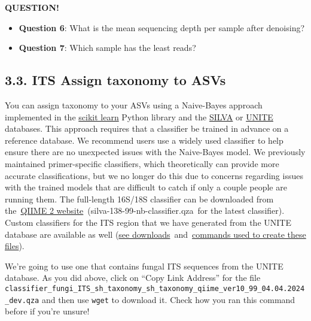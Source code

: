 \documentclass[
]{book}
\providecommand{\tightlist}{%
  \setlength{\itemsep}{0pt}\setlength{\parskip}{0pt}}
\newenvironment{bluebox}{
  \definecolor{shadecolor}{RGB}{172, 210, 237}
  \color{white}
  \begin{shaded}}
 {\end{shaded}}
\begin{document}
\begin{bluebox}

\begin{center}
\textbf{QUESTION!}

\end{center}

\begin{itemize}
\tightlist
\item
  \textbf{Question 6}: What is the mean sequencing depth per sample after denoising?
\item
  \textbf{Question 7}: Which sample has the least reads?
\end{itemize}

\end{bluebox}

\subsection{3.3. ITS Assign taxonomy to ASVs}\label{its-assign-taxonomy-to-asvs}

You can assign taxonomy to your ASVs using a Naive-Bayes approach implemented in the \href{http://scikit-learn.org/stable/}{scikit learn} Python library and the \href{https://www.arb-silva.de/}{SILVA} or \href{https://unite.ut.ee/}{UNITE} databases. This approach requires that a classifier be trained in advance on a reference database. We recommend users use a widely used classifier to help ensure there are no unexpected issues with the Naive-Bayes model. We previously maintained primer-specific classifiers, which theoretically can provide more accurate classifications, but we no longer do this due to concerns regarding issues with the trained models that are difficult to catch if only a couple people are running them. The full-length 16S/18S classifier can be downloaded from the~\href{https://docs.qiime2.org/2022.11/data-resources/}{QIIME 2 website}~(silva-138-99-nb-classifier.qza~for the latest classifier). Custom classifiers for the ITS region that we have generated from the UNITE database are available as well (\href{http://kronos.pharmacology.dal.ca/public_files/MH/taxa_classifiers/scikit-learn_v1.4.2_classifiers/}{see downloads}~and~\href{https://github.com/LangilleLab/microbiome_helper/wiki/Creating-QIIME-2-Taxonomic-Classifiers}{commands used to create these files}).

We're going to use one that contains fungal ITS sequences from the UNITE database. As you did above, click on ``Copy Link Address'' for the file \texttt{classifier\_fungi\_ITS\_sh\_taxonomy\_sh\_taxonomy\_qiime\_ver10\_99\_04.04.2024\_dev.qza} and then use \texttt{wget} to download it. Check how you ran this command before if you're unsure!
\end{document}
